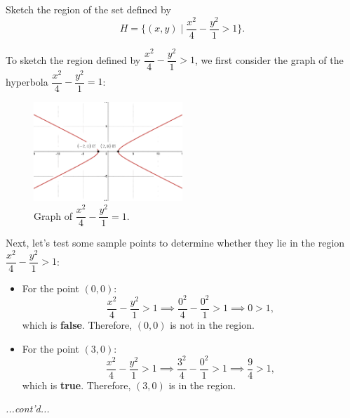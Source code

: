\documentclass{article}
\begin{document}
\begin{examplebox}
Sketch the region of the set defined by
\[
    H = \{ (x, y) \mid \dfrac{x^2}{4} - \dfrac{y^2}{1} > 1 \}.
\]

\begin{remarkbox}
    To sketch the region defined by \( \dfrac{x^2}{4} - \dfrac{y^2}{1} > 1 \), we first consider the graph of the hyperbola \( \dfrac{x^2}{4} - \dfrac{y^2}{1} = 1 \):

    \begin{figure}[H]
        \centering
        \includegraphics[width=0.5\textwidth]{x^2 over 4 + y^2 = 1.png}
        \caption{Graph of \( \dfrac{x^2}{4} - \dfrac{y^2}{1} = 1 \).}
        \label{fig:hyperbola_graph}
    \end{figure}

    Next, let’s test some sample points to determine whether they lie in the region \( \dfrac{x^2}{4} - \dfrac{y^2}{1} > 1 \):

    \begin{itemize}
        \item For the point \( (0, 0) \):
        \[
        \dfrac{x^2}{4} - \dfrac{y^2}{1} > 1 \implies \dfrac{0^2}{4} - \dfrac{0^2}{1} > 1 \implies 0 > 1,
        \]
        which is \textbf{false}. Therefore, \( (0,0) \) is not in the region.

        \item For the point \( (3, 0) \):
        \[
        \dfrac{x^2}{4} - \dfrac{y^2}{1} > 1 \implies \dfrac{3^2}{4} - \dfrac{0^2}{1} > 1 \implies \dfrac{9}{4} > 1,
        \]
        which is \textbf{true}. Therefore, \( (3,0) \) is in the region.
    \end{itemize}
\end{remarkbox}

\textit{...cont'd...}
\end{examplebox}
\end{document}
